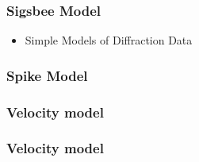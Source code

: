 \begin{frame} \frametitle{Sigsbee Model}

\begin{itemize}
   \item Simple Models of Diffraction Data 
\end{itemize}

\end{frame}
\begin{frame} \frametitle{Spike Model}

\begin{frame} \frametitle{Velocity model}
	 {}
\end{frame}	
\begin{frame} \frametitle{Velocity model}
	 {}
	 {}
\end{frame}	
\begin{frame}
	 {}
	 {}
\end{frame}	
\begin{frame}
	 {}
	 {}
\end{frame}	
\begin{frame}
	 {}
	 {}
\end{frame}	
\begin{frame}
	 {}
\end{frame}	
\begin{frame}
	 {}
	 {}
\end{frame}	
\begin{frame}
	 {}
	 {}
\end{frame}	
\begin{frame}
	 {}

\end{frame}
\end{frame}
